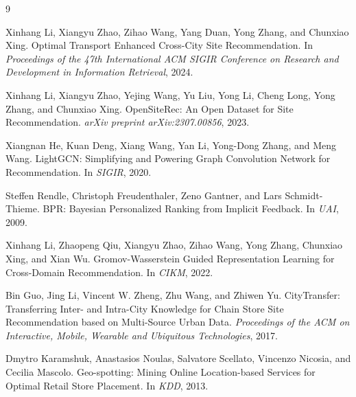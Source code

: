 \documentclass[10pt,twocolumn]{ctexart}
\begin{document}
\begin{thebibliography}{9}

Xinhang Li, Xiangyu Zhao, Zihao Wang, Yang Duan, Yong Zhang, and Chunxiao Xing.
\newblock Optimal Transport Enhanced Cross-City Site Recommendation.
\newblock In \emph{Proceedings of the 47th International ACM SIGIR Conference on Research and Development in Information Retrieval}, 2024.

Xinhang Li, Xiangyu Zhao, Yejing Wang, Yu Liu, Yong Li, Cheng Long, Yong Zhang, and Chunxiao Xing.
\newblock OpenSiteRec: An Open Dataset for Site Recommendation.
\newblock \emph{arXiv preprint arXiv:2307.00856}, 2023.

Xiangnan He, Kuan Deng, Xiang Wang, Yan Li, Yong-Dong Zhang, and Meng Wang.
\newblock LightGCN: Simplifying and Powering Graph Convolution Network for Recommendation.
\newblock In \emph{SIGIR}, 2020.

Steffen Rendle, Christoph Freudenthaler, Zeno Gantner, and Lars Schmidt-Thieme.
\newblock BPR: Bayesian Personalized Ranking from Implicit Feedback.
\newblock In \emph{UAI}, 2009.

Xinhang Li, Zhaopeng Qiu, Xiangyu Zhao, Zihao Wang, Yong Zhang, Chunxiao Xing, and Xian Wu.
\newblock Gromov-Wasserstein Guided Representation Learning for Cross-Domain Recommendation.
\newblock In \emph{CIKM}, 2022.

Bin Guo, Jing Li, Vincent W. Zheng, Zhu Wang, and Zhiwen Yu.
\newblock CityTransfer: Transferring Inter- and Intra-City Knowledge for Chain Store Site Recommendation based on Multi-Source Urban Data.
\newblock \emph{Proceedings of the ACM on Interactive, Mobile, Wearable and Ubiquitous Technologies}, 2017.

Dmytro Karamshuk, Anastasios Noulas, Salvatore Scellato, Vincenzo Nicosia, and Cecilia Mascolo.
\newblock Geo-spotting: Mining Online Location-based Services for Optimal Retail Store Placement.
\newblock In \emph{KDD}, 2013.

\end{thebibliography}
\end{document}
